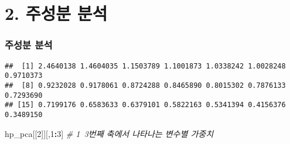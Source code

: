 \documentclass[
]{article}
\newenvironment{Shaded}{\begin{snugshade}}{\end{snugshade}}
\newcommand{\CommentTok}[1]{\textcolor[rgb]{0.56,0.35,0.01}{\textit{#1}}}
\newcommand{\DecValTok}[1]{\textcolor[rgb]{0.00,0.00,0.81}{#1}}
\newcommand{\KeywordTok}[1]{\textcolor[rgb]{0.13,0.29,0.53}{\textbf{#1}}}
\newcommand{\NormalTok}[1]{#1}
\newcommand{\OperatorTok}[1]{\textcolor[rgb]{0.81,0.36,0.00}{\textbf{#1}}}
\newcommand{\StringTok}[1]{\textcolor[rgb]{0.31,0.60,0.02}{#1}}
\begin{document}
\hypertarget{uxc8fcuxc131uxbd84-uxbd84uxc11d}{%
\section{2. 주성분 분석}\label{uxc8fcuxc131uxbd84-uxbd84uxc11d}}

\hypertarget{uxc8fcuxc131uxbd84-uxbd84uxc11d-1}{%
\subsubsection{주성분 분석}\label{uxc8fcuxc131uxbd84-uxbd84uxc11d-1}}

\begin{Shaded}
\end{Shaded}

\begin{verbatim}
##  [1] 2.4640138 1.4604035 1.1503789 1.1001873 1.0338242 1.0028248 0.9710373
##  [8] 0.9232028 0.9178061 0.8724288 0.8465890 0.8015302 0.7876133 0.7293690
## [15] 0.7199176 0.6583633 0.6379101 0.5822163 0.5341394 0.4156376 0.3489150
\end{verbatim}

\begin{Shaded}
\begin{Highlighting}[]
\NormalTok{hp_pca[[}\DecValTok{2}\NormalTok{]][,}\DecValTok{1}\OperatorTok{:}\DecValTok{3}\NormalTok{] }\CommentTok{# 1~3번째 축에서 나타나는 변수별 가중치}
\end{Highlighting}
\end{Shaded}
\end{document}
